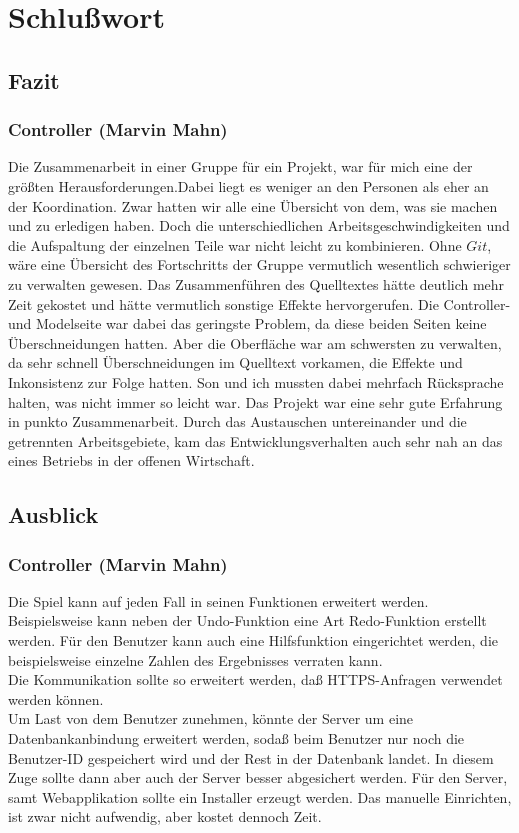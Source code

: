 \documentclass[a4paper,12pt]{scrreprt}
\begin{document}
	\chapter{Schlu{\ss}wort}
	\section{Fazit}
	\subsection{Controller (Marvin Mahn)}
	Die Zusammenarbeit in einer Gruppe f\"ur ein Projekt, war f\"ur mich eine der gr\"o{\ss}ten
	Herausforderungen.Dabei liegt es weniger an den Personen als eher an der Koordination. Zwar
	hatten wir alle eine \"Ubersicht von dem, was sie machen und zu erledigen haben. Doch die
	unterschiedlichen Arbeitsgeschwindigkeiten und die Aufspaltung der einzelnen Teile war nicht
	leicht zu kombinieren. Ohne $Git$, w\"are eine \"Ubersicht des Fortschritts der Gruppe vermutlich
	wesentlich schwieriger zu verwalten gewesen. Das Zusammenf\"uhren des Quelltextes h\"atte
	deutlich mehr Zeit gekostet und h\"atte vermutlich sonstige Effekte hervorgerufen. Die Controller-
	und Modelseite war dabei das geringste Problem, da diese beiden Seiten keine \"Uberschneidungen
	hatten. Aber die Oberfl\"ache war am schwersten zu verwalten, da sehr schnell \"Uberschneidungen
	im Quelltext vorkamen, die Effekte und Inkonsistenz zur Folge hatten. Son und ich mussten dabei
	mehrfach R\"ucksprache halten, was nicht immer so leicht war. Das Projekt war eine sehr gute
	Erfahrung in punkto Zusammenarbeit. Durch das Austauschen untereinander und die getrennten
	Arbeitsgebiete, kam das Entwicklungsverhalten auch sehr nah an das eines Betriebs in der offenen
	Wirtschaft.

	\section{Ausblick}
	\subsection{Controller (Marvin Mahn)}
	Die Spiel kann auf jeden Fall in seinen Funktionen erweitert werden. Beispielsweise kann neben der
	Undo-Funktion eine Art Redo-Funktion erstellt werden. F\"ur den Benutzer kann auch eine
	Hilfsfunktion eingerichtet werden, die beispielsweise einzelne Zahlen des Ergebnisses verraten kann.
	\medskip \\Die Kommunikation sollte so erweitert werden, da{\ss} HTTPS-Anfragen verwendet
	werden k\"onnen.\medskip \\
	Um Last von dem Benutzer zunehmen, k\"onnte der Server um eine Datenbankanbindung erweitert
	werden, soda{\ss} beim Benutzer nur noch die Benutzer-ID gespeichert wird und der Rest in der
	Datenbank landet. In diesem Zuge sollte dann aber auch der Server besser abgesichert werden. F\"ur
	den Server, samt Webapplikation sollte ein Installer erzeugt werden. Das manuelle Einrichten, ist zwar
	nicht aufwendig, aber kostet dennoch Zeit.
\end{document}
